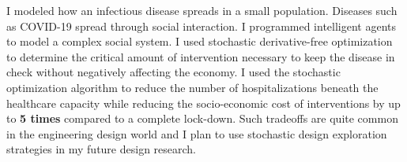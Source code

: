 \documentclass[10pt]{article} %
\begin{document}
I modeled how an infectious disease spreads in a small population. Diseases such as COVID-19 spread through social interaction. I programmed intelligent agents to model a complex social system. I used stochastic derivative-free optimization to determine the critical amount of intervention necessary to keep the disease in check without negatively affecting the economy. I used the stochastic optimization algorithm to reduce the number of hospitalizations beneath the healthcare capacity while reducing the socio-economic cost of interventions by up to \textbf{5 times} compared to a complete lock-down. Such tradeoffs are quite common in the engineering design world and I plan to use stochastic design exploration strategies in my future design research.

~
~
~
~
~
~
~

\medskip %


\end{document}
